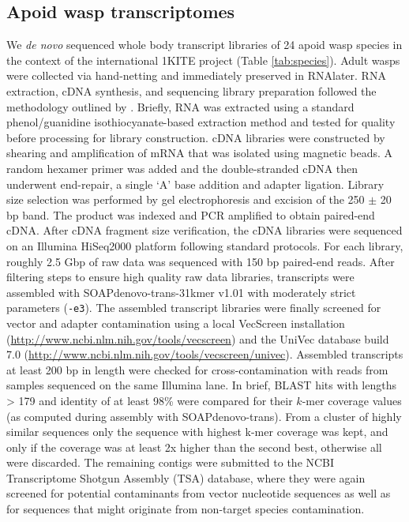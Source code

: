 \subsection{Apoid wasp transcriptomes}

We \emph{de novo} sequenced whole body transcript libraries of 24 apoid
wasp species in the context of the international 1KITE project (Table
\ref{tab:species}). Adult wasps were collected via hand-netting and immediately
preserved in RNAlater. RNA extraction, cDNA synthesis, and sequencing
library preparation followed the methodology outlined by
\citep{Misof2014}. Briefly, RNA was extracted using a standard
phenol/guanidine isothiocyanate-based extraction method and tested for
quality before processing for library construction. cDNA libraries were
constructed by shearing and amplification of mRNA that was isolated
using magnetic beads. A random hexamer primer was added and the
double-stranded cDNA then underwent end-repair, a single `A' base
addition and adapter ligation. Library size selection was performed by
gel electrophoresis and excision of the 250 $\pm$ 20 bp band. The
product was indexed and PCR amplified to obtain paired-end cDNA. After
cDNA fragment size verification, the cDNA libraries were sequenced on an
Illumina HiSeq2000 platform following standard protocols. For each
library, roughly 2.5 Gbp of raw data was sequenced with 150 bp
paired-end reads. After filtering steps to ensure high quality raw data
libraries, transcripts were assembled with SOAPdenovo-trans-31kmer v1.01
\citep{Xie2014} with moderately strict parameters (\texttt{-e3}). The
assembled transcript libraries were finally screened for vector and
adapter contamination using a local VecScreen installation
(\url{http://www.ncbi.nlm.nih.gov/tools/vecscreen}) and the UniVec
database build 7.0
(\url{http://www.ncbi.nlm.nih.gov/tools/vecscreen/univec}). Assembled
transcripts at least 200 bp in length were checked for
cross-contamination with reads from samples sequenced on the same
Illumina lane. In brief, BLAST hits with lengths \textgreater{} 179 and
identity of at least 98\% were compared for their $k$-mer coverage
values (as computed during assembly with SOAPdenovo-trans). From a
cluster of highly similar sequences only the sequence with highest k-mer
coverage was kept, and only if the coverage was at least 2x higher than
the second best, otherwise all were discarded. The remaining contigs
were submitted to the NCBI Transcriptome Shotgun Assembly (TSA)
database, where they were again screened for potential contaminants from
vector nucleotide sequences as well as for sequences that might
originate from non-target species contamination.

